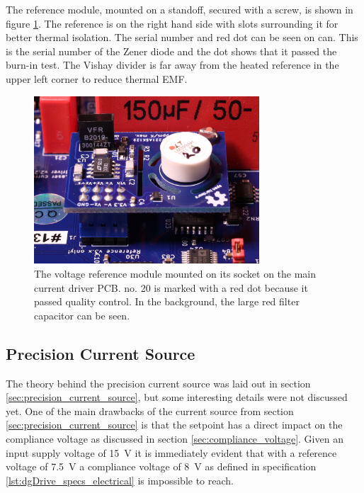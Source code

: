 The reference module, mounted on a standoff, secured with a screw, is shown in figure \ref{fig:reference_module_pcb}. The reference is on the right hand side with slots surrounding it for better thermal isolation. The serial number and red dot can be seen on can. This is the serial number of the Zener diode and the dot shows that it passed the burn-in test. The Vishay  divider is far away from the heated reference in the upper left corner to reduce thermal EMF.

\begin{figure}[hb]
    \centering
    \includegraphics[width=0.75\textwidth]{images/BM1A6694_reference_15V_lowres.JPG}
    \caption{The voltage reference module mounted on its socket on the main current driver PCB.  no. 20 is marked with a red dot because it passed quality control. In the background, the large red filter capacitor can be seen.}
    \label{fig:reference_module_pcb}
\end{figure}

\subsection{Precision Current Source}
\label{sec:results_precision_current_source}
The theory behind the precision current source was laid out in section \ref{sec:precision_current_source}, but some interesting details were not discussed yet. One of the main drawbacks of the current source from section \ref{sec:precision_current_source} is that the setpoint has a direct impact on the compliance voltage as discussed in section \ref{sec:compliance_voltage}. Given an input supply voltage of \qty{15}{\V} it is immediately evident that with a reference voltage of \qty{7.5}{\V} a compliance voltage of \qty{8}{\V} as defined in specification \ref{lst:dgDrive_specs_electrical} is impossible to reach.

